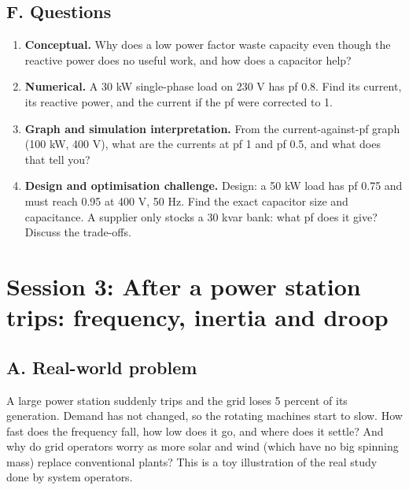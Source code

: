 \documentclass[11pt,a4paper]{article}
\begin{document}
\subsection*{F. Questions}
\begin{enumerate}[nosep]
\item \textbf{Conceptual.} Why does a low power factor waste capacity even though the reactive power does no useful work, and how does a capacitor help?
\item \textbf{Numerical.} A 30 kW single-phase load on 230 V has pf 0.8. Find its current, its reactive power, and the current if the pf were corrected to 1.
\item \textbf{Graph and simulation interpretation.} From the current-against-pf graph (100 kW, 400 V), what are the currents at pf 1 and pf 0.5, and what does that tell you?
\item \textbf{Design and optimisation challenge.} Design: a 50 kW load has pf 0.75 and must reach 0.95 at 400 V, 50 Hz. Find the exact capacitor size and capacitance. A supplier only stocks a 30 kvar bank: what pf does it give? Discuss the trade-offs.
\end{enumerate}

\section{Session 3: After a power station trips: frequency, inertia and droop}

\subsection*{A. Real-world problem}
A large power station suddenly trips and the grid loses 5 percent of its generation. Demand has not changed, so the rotating machines start to slow. How fast does the frequency fall, how low does it go, and where does it settle? And why do grid operators worry as more solar and wind (which have no big spinning mass) replace conventional plants? This is a toy illustration of the real study done by system operators.
\end{document}
